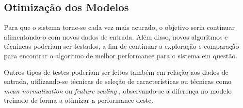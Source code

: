 		\subsection{Otimização dos Modelos}

			Para que o sistema torne-se cada vez mais acurado, o objetivo seria continuar alimentando-o com novos dados de entrada. Além disso, novos algoritmos e técnincas poderiam ser testados, a fim de continuar a exploração e comparação para encontrar o algoritmo de melhor performance para o sistema em questão.

			Outros tipos de testes poderiam ser feitos também em relação aos dados de entrada, utilizando-se técnicas de seleção de características ou técnicas como \emph{mean normalization} ou \emph{feature scaling} \cite{Coursera}, observando-se a diferença no modelo treinado de forma a otimizar a performance deste.
